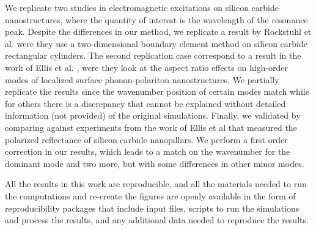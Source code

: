 {We replicate two studies in electromagnetic excitations on silicon carbide nanostructures, where the quantity of interest 
is the wavelength of the resonance peak. Despite the differences in our method, we replicate a result by Rockstuhl et al. \cite{rockstuhl2005}
were they use a two-dimensional boundary element method on silicon carbide rectangular cylinders. The second replication case correspond to 
a result in the work of Ellis et al. \cite{ellis2016}, were they look at the aspect ratio effects on high-order modes of
localized surface phonon-polariton nanostructures. We partially replicate the results since the wavenumber position of certain modes match
while for others there is a discrepancy that cannot be explained without detailed information (not provided) of the original simulations. Finally, we
validated \pygbe by comparing against experiments from the work of Ellis et al \cite{ellis2016} that measured 
the polarized reflectance of silicon carbide nanopillars. We perform a first order correction in our results, which leads to a match on the wavenumber for the 
dominant mode and two more, but with some differences in other minor modes.

All the results in this work are reproducible, and all the materials 
needed to run the computations and re-create the figures are openly available in the form of reproducibility packages 
that include input files, scripts to run the simulations and process the results, and any additional data needed 
to reproduce the results.}
